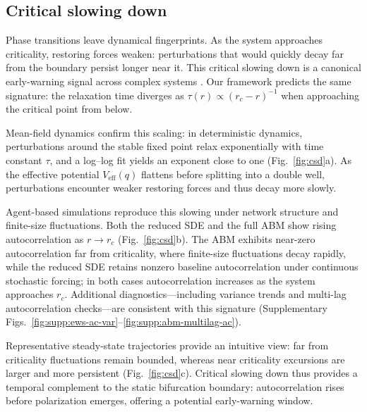 \documentclass[11pt]{article}
\begin{document}
\subsection{Critical slowing down}
\label{sec:critical-slowing-down}
Phase transitions leave dynamical fingerprints. As the system approaches criticality, restoring forces weaken: perturbations that would quickly decay far from the boundary persist longer near it. This critical slowing down is a canonical early-warning signal across complex systems \citep{Wissel1984,Scheffer2009,Scheffer2012,Dakos2012,Lenton2012RSTA,Bury2021}. Our framework predicts the same signature: the relaxation time diverges as $\tau(r)\propto (r_c-r)^{-1}$ when approaching the critical point from below.

Mean-field dynamics confirm this scaling: in deterministic dynamics, perturbations around the stable fixed point relax exponentially with time constant $\tau$, and a log--log fit yields an exponent close to one (Fig.~\ref{fig:csd}a). As the effective potential $V_{\mathrm{eff}}(q)$ flattens before splitting into a double well, perturbations encounter weaker restoring forces and thus decay more slowly.

Agent-based simulations reproduce this slowing under network structure and finite-size fluctuations. Both the reduced SDE and the full ABM show rising autocorrelation as $r\to r_c$ (Fig.~\ref{fig:csd}b). The ABM exhibits near-zero autocorrelation far from criticality, where finite-size fluctuations decay rapidly, while the reduced SDE retains nonzero baseline autocorrelation under continuous stochastic forcing; in both cases autocorrelation increases as the system approaches $r_c$. Additional diagnostics---including variance trends and multi-lag autocorrelation checks---are consistent with this signature (Supplementary Figs.~\ref{fig:supp:ews-ac-var}--\ref{fig:supp:abm-multilag-ac}).

Representative steady-state trajectories provide an intuitive view: far from criticality fluctuations remain bounded, whereas near criticality excursions are larger and more persistent (Fig.~\ref{fig:csd}c). Critical slowing down thus provides a temporal complement to the static bifurcation boundary: autocorrelation rises before polarization emerges, offering a potential early-warning window.
\end{document}
